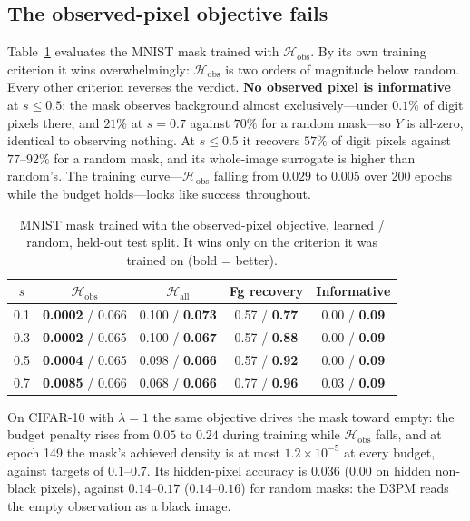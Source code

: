 \documentclass{article}
\begin{document}
\subsection{The observed-pixel objective fails}
Table~\ref{tab:mnist-old} evaluates the MNIST mask trained with $\mathcal{H}_{\mathrm{obs}}$. By its own training criterion it wins overwhelmingly: $\mathcal{H}_{\mathrm{obs}}$ is two orders of magnitude below random. Every other criterion reverses the verdict. \textbf{No observed pixel is informative} at $s \le 0.5$: the mask observes background almost exclusively---under $0.1\%$ of digit pixels there, and $21\%$ at $s = 0.7$ against $70\%$ for a random mask---so $Y$ is all-zero, identical to observing nothing. At $s \le 0.5$ it recovers $57\%$ of digit pixels against $77$--$92\%$ for a random mask, and its whole-image surrogate is higher than random's. The training curve---$\mathcal{H}_{\mathrm{obs}}$ falling from $0.029$ to $0.005$ over 200 epochs while the budget holds---looks like success throughout.

\begin{table}[t]
\centering
\caption{MNIST mask trained with the observed-pixel objective, learned / random, held-out test split. It wins only on the criterion it was trained on (bold = better).}
\label{tab:mnist-old}
\small
\setlength{\tabcolsep}{3pt}
\begin{tabular}{ccccc}
\hline
$s$ & $\mathcal{H}_{\mathrm{obs}}$ & $\mathcal{H}_{\mathrm{all}}$ & Fg recovery & Informative \\
\hline
0.1 & \textbf{0.0002} / 0.066 & 0.100 / \textbf{0.073} & 0.57 / \textbf{0.77} & 0.00 / \textbf{0.09} \\
0.3 & \textbf{0.0002} / 0.065 & 0.100 / \textbf{0.067} & 0.57 / \textbf{0.88} & 0.00 / \textbf{0.09} \\
0.5 & \textbf{0.0004} / 0.065 & 0.098 / \textbf{0.066} & 0.57 / \textbf{0.92} & 0.00 / \textbf{0.09} \\
0.7 & \textbf{0.0085} / 0.066 & 0.068 / \textbf{0.066} & 0.77 / \textbf{0.96} & 0.03 / \textbf{0.09} \\
\hline
\end{tabular}
\end{table}

On CIFAR-10 with $\lambda = 1$ the same objective drives the mask toward empty: the budget penalty rises from $0.05$ to $0.24$ during training while $\mathcal{H}_{\mathrm{obs}}$ falls, and at epoch 149 the mask's achieved density is at most $1.2 \times 10^{-5}$ at every budget, against targets of $0.1$--$0.7$. Its hidden-pixel accuracy is $0.036$ ($0.00$ on hidden non-black pixels), against $0.14$--$0.17$ ($0.14$--$0.16$) for random masks: the D3PM reads the empty observation as a black image.
\end{document}
